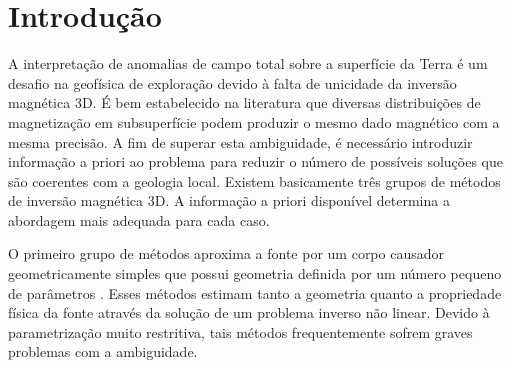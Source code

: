 \chapter{Introdução}

A interpretação de anomalias de campo total sobre a superfície da Terra é um desafio na geofísica de exploração devido à falta de unicidade da inversão magnética 3D. É bem estabelecido na literatura que diversas distribuições de magnetização em subsuperfície podem produzir o mesmo dado magnético com a mesma precisão. A fim de superar esta ambiguidade, é necessário introduzir informação a priori ao problema para reduzir o número de possíveis soluções que são coerentes com a geologia local. Existem basicamente três grupos de métodos de inversão magnética 3D. A informação a priori disponível determina a abordagem mais adequada para cada caso.

O primeiro grupo de métodos aproxima a fonte por um corpo causador geometricamente simples que possui geometria definida por um número pequeno de parâmetros \cite[por exemplo, ][]{ballantyne-1980,bhattacharyya-1980,silva-1983}. Esses métodos estimam tanto a geometria quanto a propriedade física da fonte através da solução de um problema inverso não linear. Devido à parametrização muito restritiva, tais métodos frequentemente sofrem graves problemas com a ambiguidade.

